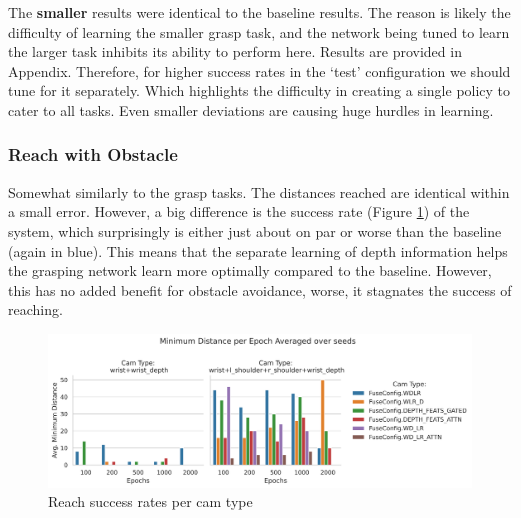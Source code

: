 The \textbf{smaller} results were identical to the baseline results. The reason is likely the difficulty of learning the smaller grasp task, and the network being tuned to learn the larger task inhibits its ability to perform here. Results are provided in Appendix. Therefore, for higher success rates in the `test' configuration we should tune for it separately. Which highlights the difficulty in creating a single policy to cater to all tasks. Even smaller deviations are causing huge hurdles in learning.

\subsubsection{Reach with Obstacle}
Somewhat similarly to the grasp tasks. The distances reached are identical within a small error.  However, a big difference is the success rate (Figure \ref{fig:sep-dep-reach-success}) of the system, which surprisingly is either just about on par or worse than the baseline (again in blue). This means that the separate learning of depth information helps the grasping network learn more optimally compared to the baseline. However, this has no added benefit for obstacle avoidance, worse, it stagnates the success of reaching.

\begin{figure}[H]
  \centering
  \includegraphics[width=\linewidth]{assets/evaluation/sep-dep/reach-success-cams-epochs.png}
  \caption{Reach success rates per cam type}\label{fig:sep-dep-reach-success}
\end{figure}
